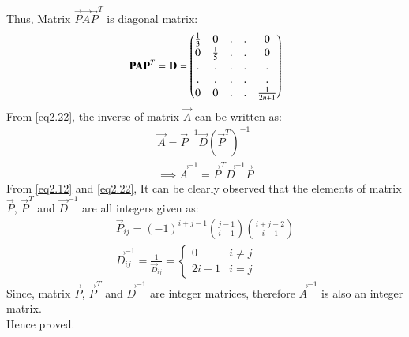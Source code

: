 \documentclass[journal,12pt,twocolumn]{IEEEtran}
\begin{document}
Thus, Matrix $\vec{P}\vec{A}\vec{P}^T$ is diagonal matrix:
\begin{align}
    \mathbf{P}\mathbf{A}\mathbf{P}^T=\mathbf{D}=\begin{pmatrix}\frac{1}{3} & 0 &.&.&0\\
    0 & \frac{1}{5} &.&.&0\\
    .&.&.&.&.\\.&.&.&.&.\\0 &0 &.&.&\frac{1}{2n+1}\end{pmatrix} \label{eq2.22}
\end{align}
From \eqref{eq2.22}, the inverse of matrix $\vec{A}$ can be written as:
\begin{align}
    \vec{A}=\vec{P}^{-1}\vec{D}(\vec{P}^T)^{-1}\\
    \implies \vec{A}^{-1}=\vec{P}^T\vec{D}^{-1}\vec{P}
\end{align}
From \eqref{eq2.12} and \eqref{eq2.22}, It can be clearly observed that the elements of matrix $\vec{P}$, $\vec{P}^T$ and $\vec{D}^{-1}$ are all integers given as:
\begin{align}
    \vec{P}_{ij}=(-1)^{i+j-1} {j-1 \choose i-1} {i+j-2 \choose i-1} \\
    \vec{D}^{-1}_{ij}=\frac{1}{\vec{D}_{ij}}=   \left\{\begin{matrix}
    0 & i\neq j\\ 
    2i+1 & i=j
    \end{matrix}\right.
\end{align}
Since, matrix $\vec{P}$, $\vec{P}^T$ and $\vec{D}^{-1}$ are integer matrices, therefore $\vec{A}^{-1}$ is also an integer matrix.\\
Hence proved.\\
\end{document}
